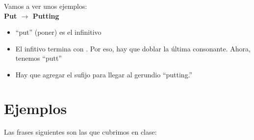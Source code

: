 Vamos a ver unos ejemplos:\\



\textbf{Put $\rightarrow$ Putting}\\
\begin{itemize}[noitemsep]
	\item ``put'' (poner) es el infinitivo
	\item El infitivo termina con . Por eso, hay que doblar la última consonante. Ahora, tenemos ``putt''
	\item Hay que agregar el sufijo  para llegar al gerundio ``putting.''
\end{itemize}

\section{Ejemplos}
Las frases siguientes son las que cubrimos en clase:

